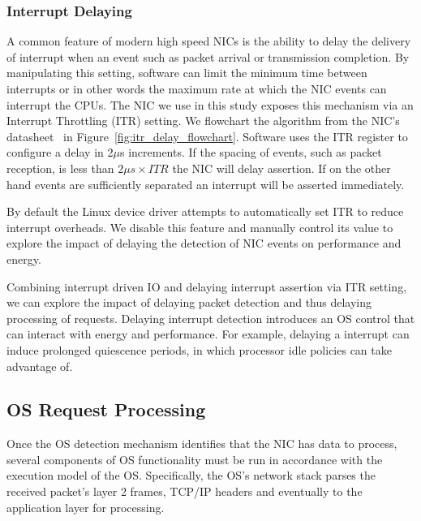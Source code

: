 \subsubsection{Interrupt Delaying}
\label{sec:workflow:itrdelay}

A common feature of modern high speed NICs is the ability to delay the delivery of interrupt when an event such as packet arrival or transmission completion. By manipulating this setting, software can limit the minimum time between interrupts or in other words the maximum rate at which the NIC events can interrupt the CPUs. The NIC we use in this study exposes this mechanism via an Interrupt Throttling (ITR) setting.  We flowchart the algorithm from the NIC's datasheet~\cite{82599} in  Figure~\ref{fig:itr_delay_flowchart}. Software uses the ITR register to configure a delay in 2$\mu$s increments.  If the spacing of events, such as packet reception, is less than  $2{\mu}s \times ITR$ the NIC will delay assertion.  If on the other hand events are sufficiently separated an interrupt will be asserted immediately.   

By default the Linux device driver attempts to automatically set ITR to reduce interrupt overheads.  We disable this feature and manually control its value to explore the impact of delaying the detection of NIC events on performance and energy.

Combining interrupt driven IO and delaying interrupt assertion via ITR setting, we can explore the impact of delaying packet detection and thus delaying processing of requests.  %
Delaying interrupt detection introduces an OS control that can interact with energy and performance. For example, delaying a interrupt can induce prolonged quiescence periods, in which processor idle policies can take advantage of.

\subsection{OS Request Processing}
\label{sec:workflow:osreqproc}

Once the OS detection mechanism identifies that the NIC has data to process, several components of OS functionality must be run in accordance with the execution model of the OS. Specifically, the OS's network stack parses the received packet's layer 2 frames, TCP/IP headers and eventually to the application layer for processing. %


